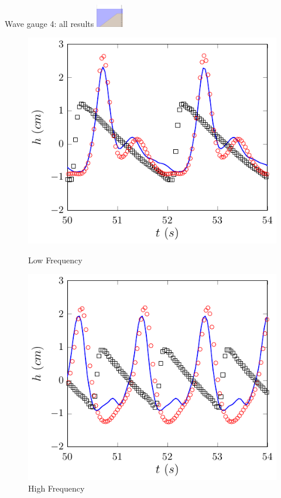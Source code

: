 \documentclass[pdf]{beamer}
\begin{document}
\begin{frame}{Wave gauge 4: all results \space\space	\includegraphics[width=1.2cm]{./Pics/WT4z.pdf}  }
	\begin{figure}
		\centering
		\begin{minipage}{.5\textwidth}
			\centering
			\includegraphics[width=0.9\linewidth]{./Pics/SL/WG4/1-figure0.pdf}
			\caption{Low Frequency}
		\end{minipage}%
		\begin{minipage}{.5\textwidth}
			\centering
			\includegraphics[width=0.9\linewidth]{./Pics/SH/WG4/1-figure0.pdf}
			\caption{High Frequency}
		\end{minipage}
	\end{figure}
\end{frame}
\end{document}

